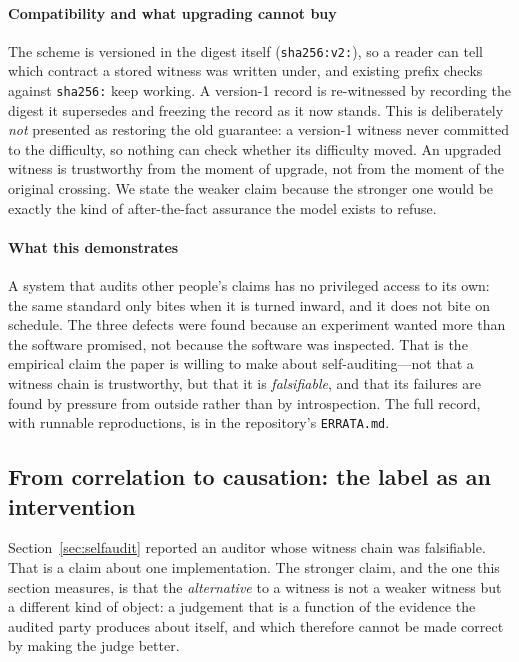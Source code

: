 \documentclass[conference]{IEEEtran}
\theoremstyle{definition}
\begin{document}
\paragraph{Compatibility and what upgrading cannot buy} The scheme is versioned in
the digest itself (\texttt{sha256:v2:}), so a reader can tell which contract a
stored witness was written under, and existing prefix checks against
\texttt{sha256:} keep working. A version-1 record is re-witnessed by recording the
digest it supersedes and freezing the record as it now stands. This is deliberately
\emph{not} presented as restoring the old guarantee: a version-1 witness never
committed to the difficulty, so nothing can check whether its difficulty moved.
An upgraded witness is trustworthy from the moment of upgrade, not from the moment
of the original crossing. We state the weaker claim because the stronger one would
be exactly the kind of after-the-fact assurance the model exists to refuse.

\paragraph{What this demonstrates} A system that audits other people's claims has no
privileged access to its own: the same standard only bites when it is turned inward,
and it does not bite on schedule. The three defects were found because an experiment
wanted more than the software promised, not because the software was inspected. That
is the empirical claim the paper is willing to make about self-auditing---not that a
witness chain is trustworthy, but that it is \emph{falsifiable}, and that its failures
are found by pressure from outside rather than by introspection. The full record, with
runnable reproductions, is in the repository's \texttt{ERRATA.md}.

\subsection{From correlation to causation: the label as an intervention}
\label{sec:causal}

Section~\ref{sec:selfaudit} reported an auditor whose witness chain was falsifiable.
That is a claim about one implementation. The stronger claim, and the one this
section measures, is that the \emph{alternative} to a witness is not a weaker
witness but a different kind of object: a judgement that is a function of the
evidence the audited party produces about itself, and which therefore cannot be
made correct by making the judge better.
\end{document}
